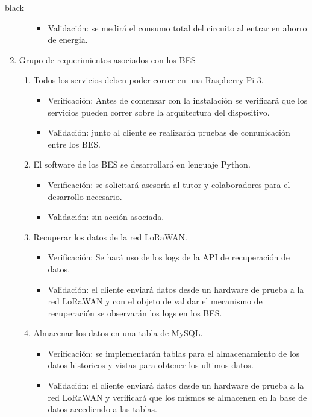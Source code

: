 \documentclass[11pt]{charter}
\begin{document}
\begin{consigna}{black}
\begin{enumerate}
\begin{enumerate}[label*=\arabic*.]
\begin{itemize}
					\item Validación: se medirá el consumo total del circuito al entrar en ahorro de energia.\\
				\end{itemize}
		\end{enumerate}
	\item Grupo de requerimientos asociados con los BES
		\begin{enumerate}[label*=\arabic*.]
			\item Todos los servicios deben poder correr en una Raspberry Pi 3.
			\begin{itemize}
				\item Verificación: Antes de comenzar con la instalación se verificará que los servicios pueden correr sobre la arquitectura del dispositivo.\\
				\item Validación: junto al cliente se realizarán pruebas de comunicación entre los BES.\\
			\end{itemize}
			
			\item El software de los BES se desarrollará en lenguaje Python.
			\begin{itemize}
				\item Verificación: se solicitará asesoría al tutor y colaboradores para el desarrollo necesario.\\
				\item Validación: sin acción asociada.\\
			\end{itemize}
			
			\item Recuperar los datos de la red LoRaWAN.
			\begin{itemize}
				\item Verificación: Se hará uso de los logs de la API de recuperación de datos.\\
				\item Validación: el cliente enviará datos desde un hardware de prueba a la red LoRaWAN y con el objeto de validar el mecanismo de recuperación se observarán los logs en los BES.\\
			\end{itemize}

			\item Almacenar los datos en una tabla de MySQL.
			\begin{itemize}
				\item Verificación: se implementarán tablas para el almacenamiento de los datos historicos y vistas para obtener los ultimos datos.\\
				\item Validación: el cliente enviará datos desde un hardware de prueba a la red LoRaWAN y verificará que los mismos se almacenen en la base de datos accediendo a las tablas.\\
			\end{itemize}
			

\end{enumerate}
\end{enumerate}
\end{consigna}
\end{document}
